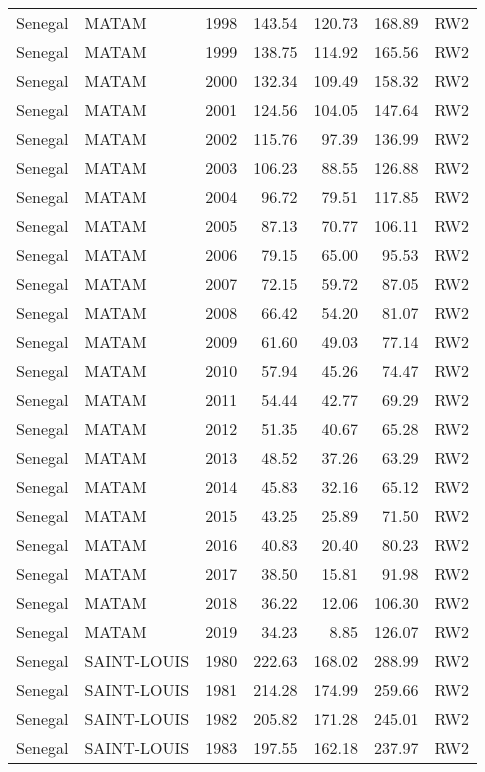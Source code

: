 \begin{longtable}{lllrrrl}
  Senegal & MATAM & 1998 & 143.54 & 120.73 & 168.89 & RW2 \\ 
  Senegal & MATAM & 1999 & 138.75 & 114.92 & 165.56 & RW2 \\ 
  Senegal & MATAM & 2000 & 132.34 & 109.49 & 158.32 & RW2 \\ 
  Senegal & MATAM & 2001 & 124.56 & 104.05 & 147.64 & RW2 \\ 
  Senegal & MATAM & 2002 & 115.76 & 97.39 & 136.99 & RW2 \\ 
  Senegal & MATAM & 2003 & 106.23 & 88.55 & 126.88 & RW2 \\ 
  Senegal & MATAM & 2004 & 96.72 & 79.51 & 117.85 & RW2 \\ 
  Senegal & MATAM & 2005 & 87.13 & 70.77 & 106.11 & RW2 \\ 
  Senegal & MATAM & 2006 & 79.15 & 65.00 & 95.53 & RW2 \\ 
  Senegal & MATAM & 2007 & 72.15 & 59.72 & 87.05 & RW2 \\ 
  Senegal & MATAM & 2008 & 66.42 & 54.20 & 81.07 & RW2 \\ 
  Senegal & MATAM & 2009 & 61.60 & 49.03 & 77.14 & RW2 \\ 
  Senegal & MATAM & 2010 & 57.94 & 45.26 & 74.47 & RW2 \\ 
  Senegal & MATAM & 2011 & 54.44 & 42.77 & 69.29 & RW2 \\ 
  Senegal & MATAM & 2012 & 51.35 & 40.67 & 65.28 & RW2 \\ 
  Senegal & MATAM & 2013 & 48.52 & 37.26 & 63.29 & RW2 \\ 
  Senegal & MATAM & 2014 & 45.83 & 32.16 & 65.12 & RW2 \\ 
  Senegal & MATAM & 2015 & 43.25 & 25.89 & 71.50 & RW2 \\ 
  Senegal & MATAM & 2016 & 40.83 & 20.40 & 80.23 & RW2 \\ 
  Senegal & MATAM & 2017 & 38.50 & 15.81 & 91.98 & RW2 \\ 
  Senegal & MATAM & 2018 & 36.22 & 12.06 & 106.30 & RW2 \\ 
  Senegal & MATAM & 2019 & 34.23 & 8.85 & 126.07 & RW2 \\ 
  Senegal & SAINT-LOUIS & 1980 & 222.63 & 168.02 & 288.99 & RW2 \\ 
  Senegal & SAINT-LOUIS & 1981 & 214.28 & 174.99 & 259.66 & RW2 \\ 
  Senegal & SAINT-LOUIS & 1982 & 205.82 & 171.28 & 245.01 & RW2 \\ 
  Senegal & SAINT-LOUIS & 1983 & 197.55 & 162.18 & 237.97 & RW2 \\ 

\end{longtable}
